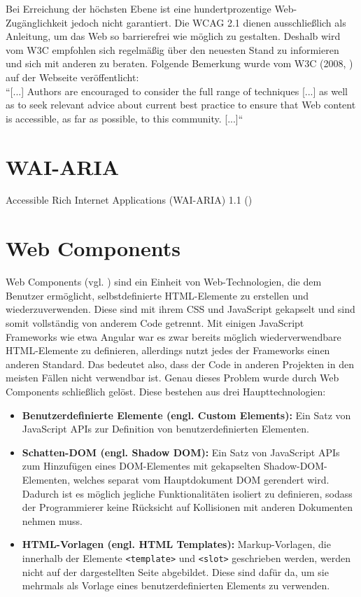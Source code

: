 Bei Erreichung der höchsten Ebene ist eine hundertprozentige Web-Zugänglichkeit jedoch nicht garantiert. Die WCAG 2.1 dienen ausschließlich als Anleitung, um das Web so barrierefrei wie möglich zu gestalten. Deshalb wird vom W3C empfohlen sich regelmäßig über den neuesten Stand zu informieren und sich mit anderen zu beraten. Folgende Bemerkung wurde vom W3C (2008, \cite{wcag_2_1_2018}) auf der Webseite veröffentlicht:\\
``[...] Authors are encouraged to consider the full range of techniques [...] as well as to seek relevant advice about current best practice to ensure that Web content is accessible, as far as possible, to this community. [...]``

\section{WAI-ARIA}
Accessible Rich Internet Applications (WAI-ARIA) 1.1 (\cite{wai_aria_2017})

\section{Web Components}
\label{web_comp}
Web Components (vgl. \cite{moz_webcomp_2019}) sind ein Einheit von Web-Technologien, die dem Benutzer ermöglicht, selbstdefinierte HTML-Elemente zu erstellen und wiederzuverwenden. Diese sind mit ihrem CSS und JavaScript gekapselt und sind somit vollständig von anderem Code getrennt. Mit einigen JavaScript Frameworks wie etwa Angular war es zwar bereits möglich wiederverwendbare HTML-Elemente zu definieren, allerdings nutzt jedes der Frameworks einen anderen Standard. Das bedeutet also, dass der Code in anderen Projekten in den meisten Fällen nicht verwendbar ist. Genau dieses Problem wurde durch Web Components schließlich gelöst. Diese bestehen aus drei Haupttechnologien:

\begin{itemize}
	\item \textbf{Benutzerdefinierte Elemente (engl. Custom Elements):} Ein Satz von JavaScript APIs zur Definition von benutzerdefinierten Elementen.
	\item \textbf{Schatten-DOM (engl. Shadow DOM):} Ein Satz von JavaScript APIs zum Hinzufügen eines DOM-Elementes mit gekapselten Shadow-DOM-Elementen, welches separat vom Hauptdokument DOM gerendert wird. Dadurch ist es möglich jegliche Funktionalitäten isoliert zu definieren, sodass der Programmierer keine Rücksicht auf Kollisionen mit anderen Dokumenten nehmen muss.
	\item \textbf{HTML-Vorlagen (engl. HTML Templates):} Markup-Vorlagen, die innerhalb der Elemente \texttt{<template>} und \texttt{<slot>} geschrieben werden, werden nicht auf der dargestellten Seite abgebildet. Diese sind dafür da, um sie mehrmals als Vorlage eines benutzerdefinierten Elements zu verwenden.
\end{itemize}

